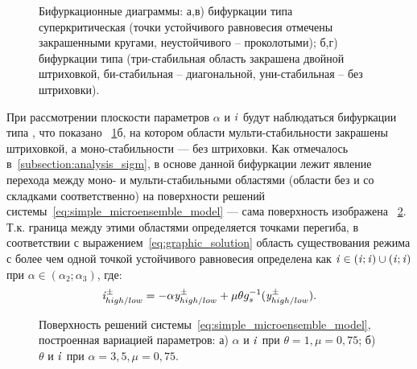 \begin{figure}[t]
    \caption{Бифуркационные диаграммы: а,в) бифуркации типа суперкритическая  (точки устойчивого равновесия отмечены закрашенными кругами, неустойчивого -- проколотыми); б,г) бифуркации типа  (три-стабильная область закрашена двойной штриховкой, би-стабильная -- диагональной, уни-стабильная -- без штриховки).}
    \label{fig:analysis_origin_bifurcations}
\end{figure}

При рассмотрении плоскости параметров $\alpha$ и $\mathit{i}$ будут наблюдаться бифуркации типа , что показано \onfigure~\ref{fig:analysis_origin_bifurcations}б, на котором области мульти-стабильности закрашены штриховкой, а моно-стабильности --- без штриховки. Как отмечалось в~\autoref{subsection:analysis_sigm}, в основе данной бифуркации лежит явление перехода между моно- и мульти-стабильными областями (области без и со складками соответственно) на поверхности решений системы~\eqref{eq:simple_microensemble_model} --- сама поверхность изображена \onfigure~\ref{fig:analysis_origin_solution_surface}. Т.к. граница между этими областями определяется точками перегиба, в соответствии с выражением~\eqref{eq:graphic_solution} область существования режима с более чем одной точкой устойчивого равновесия определена как $\mathit{i} \in (\mathit{i}; \mathit{i}) \cup (\mathit{i}; \mathit{i})$ при $\alpha \in (\alpha_{2}; \alpha_{3})$, где:
\begin{equation}
    \label{eq:origin_bifurcation_i}
    \mathit{i}_{high/low}^{\pm} = -\alpha \mathit{y}_{high/low}^{\pm} + \mu \theta g_{s}^{-1}(\mathit{y}_{high/low}^{\pm}).
\end{equation}
\begin{figure}[ht]
    \caption{Поверхность решений системы~\eqref{eq:simple_microensemble_model}, построенная вариацией параметров: а) $\alpha$ и $\mathit{i}$ при $\theta = 1, \mu = 0,75$; б) $\theta$ и $\mathit{i}$ при $\alpha = 3,5, \mu = 0,75$.}
    \label{fig:analysis_origin_solution_surface}
\end{figure}

